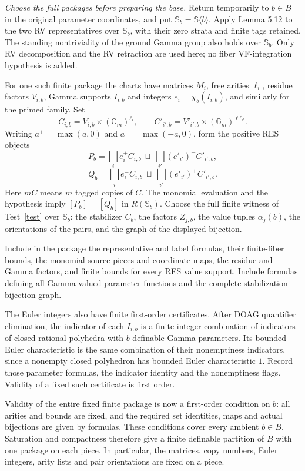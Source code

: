 \documentclass[12pt]{amsart}
\theoremstyle{remark}
\theoremstyle{definition}
\newcommand{\Sbase}{\mathbb S}
\numberwithin{equation}{section}
\newcommand{\Gm}{\mathbb G_m}
\theoremstyle{plain}
\newcommand{\Sfiber}{\mathbb S_b}
\theoremstyle{plain}
\begin{document}
{\medskip
\noindent\emph{Choose the full packages before preparing the base.}
Return temporarily to $b\in B$ in the original parameter
coordinates, and put $\Sfiber=\Sbase\langle b\rangle$.
Apply Lemma 5.12 to the two RV representatives over
$\Sfiber$, with their zero strata and finite tags retained.
The standing nontriviality of the ground Gamma group
also holds over $\Sfiber$.
Only RV decomposition and the RV retraction are used here;
no fiber VF-integration hypothesis is added.

For one such finite package the charts have matrices $M_i$,
free arities $\ell_i$, residue factors $V_{i,b}$,
Gamma supports $I_{i,b}$ and integers
$e_i=\chi_b(I_{i,b})$, and similarly for the primed family.
Set
\[
 C_{i,b}=V_{i,b}\times(\Gm)^{\ell_i},
 \qquad C'_{i',b}=V'_{i',b}\times(\Gm)^{\ell'_{i'}}.
\]
Writing $a^+=\max(a,0)$ and $a^-=\max(-a,0)$, form the
positive RES objects
\[
 P_b=\bigsqcup_i e_i^+ C_{i,b}
       \ \sqcup\ \bigsqcup_{i'}(e'_{i'})^- C'_{i',b},
\]
\[
 Q_b=\bigsqcup_i e_i^- C_{i,b}
       \ \sqcup\ \bigsqcup_{i'}(e'_{i'})^+ C'_{i',b}.
\]
Here $mC$ means $m$ tagged copies of $C$.
The monomial evaluation and the hypothesis imply
$[P_b]=[Q_b]$ in $R(\Sfiber)$.
Choose the full finite witness of Test~\ref{test} over
$\Sfiber$: the stabilizer $C_b$, the factors $Z_{j,b}$,
the value tuples $\alpha_j(b)$, the orientations of the
pairs, and the graph of the displayed bijection.

Include in the package the representative and label
formulas, their finite-fiber bounds, the monomial source
pieces and coordinate maps, the residue and Gamma factors,
and finite bounds for every RES value support.
Include formulas defining all Gamma-valued parameter
functions and the complete stabilization bijection graph.

The Euler integers also have finite first-order certificates.
After DOAG quantifier elimination, the indicator of each
$I_{i,b}$ is a finite integer combination of indicators
of closed rational polyhedra with $b$-definable Gamma
parameters. Its bounded Euler characteristic is the
same combination of their nonemptiness indicators,
since a nonempty closed polyhedron has bounded Euler
characteristic $1$.
Record those parameter formulas, the indicator identity
and the nonemptiness flags.
Validity of a fixed such certificate is first order.

Validity of the entire fixed finite package is now a
first-order condition on $b$: all arities and bounds are
fixed, and the required set identities, maps and actual
bijections are given by formulas.
These conditions cover every ambient $b\in B$.
Saturation and compactness therefore give a finite
definable partition of $B$ with one package on each piece.
In particular, the matrices, copy numbers, Euler integers,
arity lists and pair orientations are fixed on a piece.

}
\end{document}
